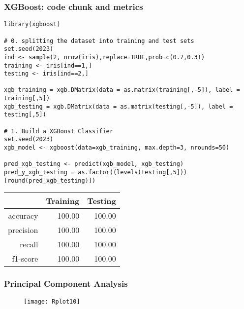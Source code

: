 \documentclass[border=5mm, convert, usenames, dvipsnames,beamer]{standalone}
\begin{document}
\begin{frame}[ fragile]{}
\frametitle{XGBoost: code chunk and metrics}

\vspace{30}
\noindent


\begin{lstlisting}[style=R]
library(xgboost)

# 0. splitting the dataset into training and test sets
set.seed(2023)
ind <- sample(2, nrow(iris),replace=TRUE,prob=c(0.7,0.3))
training <- iris[ind==1,]
testing <- iris[ind==2,]

xgb_training = xgb.DMatrix(data = as.matrix(training[,-5]), label = training[,5])
xgb_testing = xgb.DMatrix(data = as.matrix(testing[,-5]), label = testing[,5])

# 1. Build a XGBoost Classifier
set.seed(2023)
xgb_model <- xgboost(data=xgb_training, max.depth=3, nrounds=50)

pred_xgb_testing <- predict(xgb_model, xgb_testing)
pred_y_xgb_testing = as.factor((levels(testing[,5]))[round(pred_xgb_testing)])
\end{lstlisting}

\begin{table}[ht]
\centering
\begin{tabular}{rrr}
  \hline
 & Training & Testing \\ 
  \hline
accuracy & 100.00 & 100.00 \\ 
  precision & 100.00 & 100.00 \\ 
  recall & 100.00 & 100.00 \\ 
  f1-score & 100.00 & 100.00 \\ 
   \hline
\end{tabular}
\end{table}




\end{frame}



\begin{frame}[ fragile]{}
\frametitle{Principal Component Analysis}

\vspace{40}
\noindent

\vspace{0mm}
\begin{figure}[h!]
\begin{center}
\texttt{[image: Rplot10]}
\end{center}
\end{figure}




\end{frame}
\end{document}
